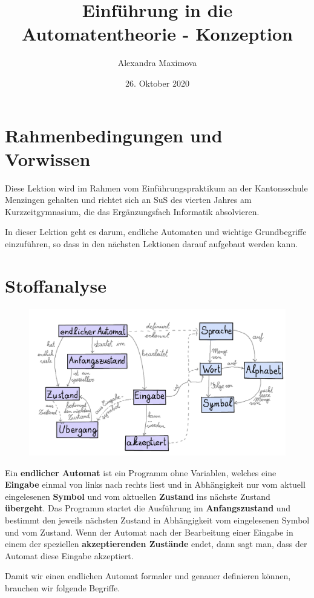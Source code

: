 \documentclass{article}
\title{Einführung in die Automatentheorie - Konzeption}
\author{Alexandra Maximova}
\date{26. Oktober 2020}
\begin{document}
\maketitle
\section{Rahmenbedingungen und Vorwissen}
Diese Lektion wird im Rahmen vom Einführungspraktikum an der Kantonsschule Menzingen gehalten und richtet sich an SuS des vierten Jahres am Kurzzeitgymnasium, die das Ergänzungsfach Informatik absolvieren.

In dieser Lektion geht es darum, endliche Automaten und wichtige Grundbegriffe einzuführen, so dass in den nächsten Lektionen darauf aufgebaut werden kann.

\section{Stoffanalyse}
\begin{figure}[H]
\centering
\includegraphics[width=\linewidth]{Pictures/ConceptMap.png}
\end{figure}

Ein \textbf{endlicher Automat} ist ein Programm ohne Variablen, welches eine \textbf{Eingabe} einmal von links nach rechts liest und in Abhängigkeit nur vom aktuell eingelesenen \textbf{Symbol} und vom aktuellen \textbf{Zustand} ins nächste Zustand \textbf{übergeht}. Das Programm startet die Ausführung im \textbf{Anfangszustand} und bestimmt den jeweils nächsten Zustand in Abhängigkeit vom eingelesenen Symbol und vom Zustand. Wenn der Automat nach der Bearbeitung einer Eingabe in einem der speziellen \textbf{akzeptierenden Zustände} endet, dann sagt man, dass der Automat diese Eingabe akzeptiert.

Damit wir einen endlichen Automat formaler und genauer definieren können, brauchen wir folgende Begriffe.
\end{document}
